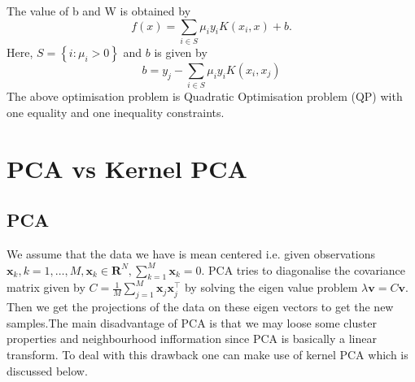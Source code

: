 \documentclass[../main.tex]{subfiles}
\begin{document}
The value of b and W is obtained by 
$$
f(x)=\sum_{i \in S} \mu_{i} y_{i} K\left(x_{i}, x\right)+b .
$$
Here, $S=\left\{i: \mu_{i}>0\right\}$ and $b$ is given by
$$
b=y_{j}-\sum_{i \in S} \mu_{i} y_{i} K\left(x_{i}, x_{j}\right)
$$
The above optimisation problem is Quadratic Optimisation problem (QP) with one equality and one inequality constraints.

\section{PCA vs Kernel PCA}
    \subsection{PCA}
We assume that the data we have is mean centered i.e. given observations $\mathbf{x}_{k}, k=1, \ldots, M, \mathbf{x}_{k} \in \mathbf{R}^{N}, \sum_{k=1}^{M} \mathbf{x}_{k}=0$. PCA tries to diagonalise the covariance matrix given by $C=\frac{1}{M} \sum_{j=1}^{M} \mathbf{x}_{j} \mathbf{x}_{j}^{\top}$ by solving the eigen value problem $\lambda \mathbf{v}=C \mathbf{v}$.
Then we get the projections of the data on these eigen vectors to get the new samples.The main disadvantage of PCA is that we may loose some cluster properties and neighbourhood infformation since PCA is basically a linear transform. To deal with this drawback one can make use of kernel PCA which is discussed below.
\end{document}
